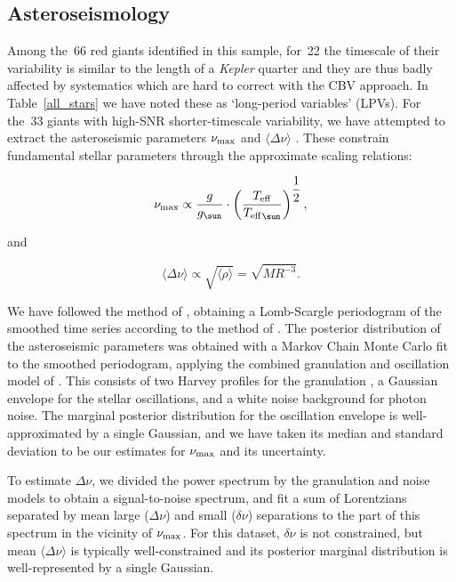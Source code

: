 \documentclass[a4paper,fleqn,usenatbib]{mnras}
\newcommand{\numax}{\mbox{$\nu_{\rm max}$}\xspace}
\newcommand{\Dnu}{\mbox{$\Delta \nu$}\xspace}
\newcommand{\dnu}{\mbox{$\delta \nu$}\xspace}
\newcommand{\teff}{\mbox{$T_{\rm eff}$}\xspace}
\newcommand{\kepler}{\textit{Kepler}\xspace}
\begin{document}



\subsection{Asteroseismology}
\label{asteroseismology}

Among the~66 red giants identified in this sample, for~22 the timescale of their variability is similar to the length of a \kepler quarter and they are thus badly affected by systematics which are hard to correct with the CBV approach. In Table~\ref{all_stars} we have noted these as `long-period variables' (LPVs). For the~33 giants with high-SNR shorter-timescale variability, we have attempted to extract the asteroseismic parameters \numax and $\langle \Dnu \rangle$ \citep{KB95,2013ARA&A..51..353C}. These constrain fundamental stellar parameters through the approximate scaling relations: 

\begin{equation}
\label{scaling}
\numax \propto \dfrac{g}{g_{\sun}} \cdot \left(\dfrac{\teff}{\teff_{\sun}}\right)^{\dfrac{1}{2}},
\end{equation}

and

\begin{equation}
\label{Dnuscaling}
\langle \Dnu \rangle \propto \sqrt{\langle \rho \rangle} = \sqrt{M {R}^{-3}}.
\end{equation}

We have followed the method of \citet{2016AN....337..774D}, obtaining a Lomb-Scargle periodogram of the smoothed time series according to the method of \citet{2011MNRAS.414L...6G}. The posterior distribution of the asteroseismic parameters was obtained with a Markov Chain Monte Carlo fit to the smoothed periodogram, applying the combined granulation and oscillation model of \citet{2014A&A...570A..41K}. This consists of two Harvey profiles for the granulation \citep{1985ESASP.235..199H}, a Gaussian envelope for the stellar oscillations, and a white noise background for photon noise. The marginal posterior distribution for the oscillation envelope is well-approximated by a single Gaussian, and we have taken its median and standard deviation to be our estimates for \numax and its uncertainty.

To estimate \Dnu, we divided the power spectrum by the granulation and noise models to obtain a signal-to-noise spectrum, and fit a sum of Lorentzians separated by mean large (\Dnu) and small (\dnu) separations to the part of this spectrum in the vicinity of \numax. For this dataset, \dnu is not constrained, but mean $\langle \Dnu \rangle$ is typically well-constrained and its posterior marginal distribution is well-represented by a single Gaussian. 
\end{document}
